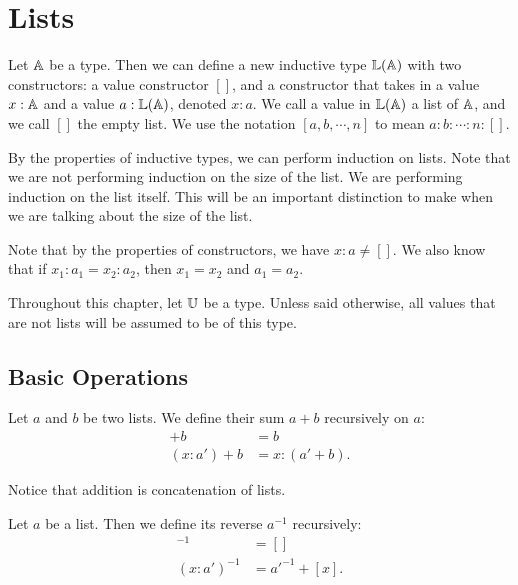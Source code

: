 \documentclass[../../math.tex]{subfiles}
\begin{document}
\setcounter{chapter}{4}

\chapter{Lists}

\begin{definition}
    Let $\mathbb{A}$ be a type.  Then we can define a new inductive type $\mathbb{L}(\mathbb{A})$ with
    two constructors: a value constructor $[]$, and a constructor that takes in
    a value $x : \mathbb{A}$ and a value $a : \mathbb{L}(\mathbb{A})$, denoted $x : a$.  We call a
    value in $\mathbb{L}(\mathbb{A})$ a list of $\mathbb{A}$, and we call $[]$ the empty list.  We use
    the notation $[a, b, \cdots, n]$ to mean $a : b : \cdots : n : []$.
\end{definition}

By the properties of inductive types, we can perform induction on lists.  Note
that we are not performing induction on the size of the list.  We are performing
induction on the list itself.  This will be an important distinction to make
when we are talking about the size of the list.

Note that by the properties of constructors, we have $x : a \neq []$.  We also
know that if $x_1 : a_1 = x_2 : a_2$, then $x_1 = x_2$ and $a_1 = a_2$.

Throughout this chapter, let $\mathbb{U}$ be a type.  Unless said otherwise, all values
that are not lists will be assumed to be of this type.

\section{Basic Operations}

\begin{instance}
    Let $a$ and $b$ be two lists.  We define their sum $a + b$ recursively on
    $a$:
    \begin{align*}
              [] + b &= b \\
        (x : a') + b &= x : (a' + b).
    \end{align*}
\end{instance}
\noindent Notice that addition is concatenation of lists.

\begin{definition}
    Let $a$ be a list.  Then we define its reverse $a^{-1}$ recursively:
    \begin{align*}
              []^{-1} &= [] \\
        (x : a')^{-1} &= a'^{-1} + [x].
    \end{align*}
\end{definition}
\end{document}
